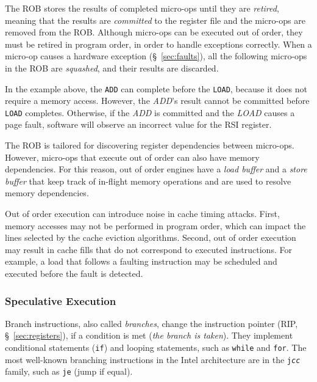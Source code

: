 The ROB stores the results of completed micro-ops until they are
\textit{retired}, meaning that the results are \textit{committed} to the
register file and the micro-ops are removed from the ROB. Although micro-ops
can be executed out of order, they must be retired in program order, in order
to handle exceptions correctly. When a micro-op causes a hardware exception
(\S~\ref{sec:faults}), all the following micro-ops in the ROB are
\textit{squashed}, and their results are discarded.

In the example above, the \texttt{ADD} can complete before the \texttt{LOAD},
because it does not require a memory access. However, the \textit{ADD}'s result
cannot be committed before \texttt{LOAD} completes. Otherwise, if the
\textit{ADD} is committed and the \textit{LOAD} causes a page fault, software
will observe an incorrect value for the  RSI register.


The ROB is tailored for discovering register dependencies between micro-ops.
However, micro-ops that execute out of order can also have memory dependencies.
For this reason, out of order engines have a \textit{load buffer} and a
\textit{store buffer} that keep track of in-flight memory operations and are
used to resolve memory dependencies.

Out of order execution can introduce noise in cache timing attacks. First,
memory accesses may not be performed in program order, which can impact the
lines selected by the cache eviction algorithms. Second, out of order execution
may result in cache fills that do not correspond to executed instructions. For
example, a load that follows a faulting instruction may be scheduled and
executed before the fault is detected.


\subsubsection{Speculative Execution}


Branch instructions, also called \textit{branches}, change the instruction
pointer (RIP, \S~\ref{sec:registers}), if a condition is met (\textit{the
branch is taken}). They implement conditional statements (\texttt{if}) and
looping statements, such as \texttt{while} and \texttt{for}. The most
well-known branching instructions in the Intel architecture are in the
\texttt{j\textit{cc}} family, such as \texttt{je} (jump if equal).

